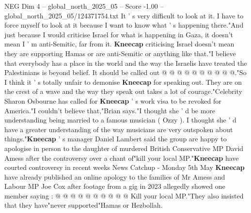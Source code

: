 \begin{textsample}{NEG Dim 4 – global\_north\_2025\_05 – Score -1.00 – global\_north\_2025\_05/124371754.txt}
It ' s very difficult to look at it.
I have to force myself to look at it because I want to know what ' s happening there."And just because I would criticise Israel for what is happening in Gaza, it doesn't mean I ' m anti-Semitic, far from it. \textbf{Kneecap} criticising Israel doesn't mean they are supporting Hamas or are anti-Semitic or anything like that."I believe that everybody has a place in the world and the way the Israelis have treated the Palestinians is beyond belief.
It should be called out @ @ @ @ @ @ @ @ @ @."So I think it ' s totally unfair to demonise \textbf{Kneecap} for speaking out.
They are on the crest of a wave and the way they speak out takes a lot of courage."Celebrity Sharon Osbourne has called for \textbf{Kneecap} ' s work visa to be revoked for America."I couldn't believe that,"Brian says."I thought she ' d be more understanding being married to a famous musician ( Ozzy ).
I thought she ' d have a greater understanding of the way musicians are very outspoken about things."\textbf{Kneecap} ' s manager Daniel Lambert said the group are happy to apologise in person to the daughter of murdered British Conservative MP David Amess after the controversy over a chant of"kill your local MP."\textbf{Kneecap} have courted controversy in recent weeks News Catchup - Monday 5th May \textbf{Kneecap} have already published an online apology to the families of Mr Amess and Labour MP Joe Cox after footage from a gig in 2023 allegedly showed one member saying : @ @ @ @ @ @ @ @ @ @ Kill your local MP."They also insisted that they have"never supported"Hamas or Hezbollah.

\end{textsample}
